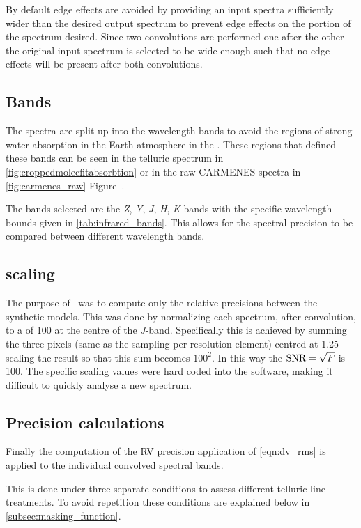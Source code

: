 By default edge effects are avoided by providing an input spectra sufficiently wider than the desired output spectrum to prevent edge effects on the portion of the spectrum desired.
Since two convolutions are performed one after the other the original input spectrum is selected to be wide enough such that no edge effects will be present after both convolutions.

\subsection{Bands}
The spectra are split up into the \nir{} wavelength bands to avoid the regions of strong water absorption in the Earth atmosphere in the \nir{}. These  regions that defined these bands can be seen in the telluric spectrum in \cref{fig:croppedmolecfitabsorbtion} or in the raw {CARMENES} spectra in \cref{fig:carmenes_raw} Figure~.

The bands selected are the \emph{Z}, \emph{Y}, \emph{J}, \emph{H}, \emph{K}-bands with the specific wavelength bounds given in \cref{tab:infrared_bands}. This allows for the spectral precision to be compared between different wavelength bands.

\subsection{\snr{} scaling}
The purpose of~\citet{figueira_radial_2016} was to compute only the relative precisions between the synthetic models. This was done by normalizing each spectrum, after convolution, to a \snr{} of 100 at the centre of the \emph{J}-band. Specifically this is achieved by summing the three pixels (same as the sampling per resolution element) centred at 1.25\nm{} scaling the result so that this sum becomes \(100^2\). In this way the \(\textrm{SNR}{} =\sqrt{F}\) is 100. The specific scaling values were hard coded into the software, making it difficult to quickly analyse a new spectrum.

\subsection{Precision calculations}
Finally the computation of the {RV} precision application of \cref{eqn:dv_rms} is applied to the individual convolved spectral bands.

This is done under three separate conditions to assess different telluric line treatments. To avoid repetition these conditions are explained below in \cref{subsec:masking_function}.
